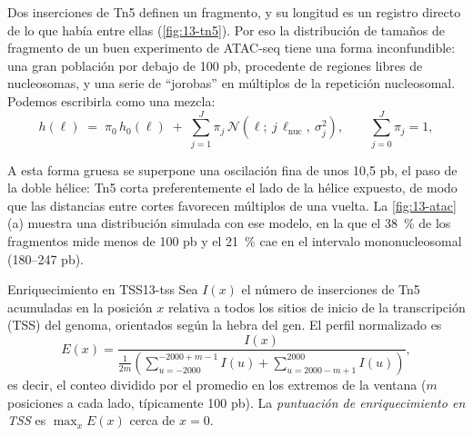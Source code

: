 Dos inserciones de Tn5 definen un fragmento, y su longitud es un registro directo de lo que había entre ellas (\cref{fig:13-tn5}). Por eso la distribución de tamaños de fragmento de un buen experimento de ATAC-seq tiene una forma inconfundible: una gran población por debajo de 100 pb, procedente de regiones libres de nucleosomas, y una serie de ``jorobas'' en múltiplos de la repetición nucleosomal. Podemos escribirla como una mezcla:
\begin{equation}\label{eq:13-atac}
h(\ell) \;=\; \pi_0\,h_0(\ell) \;+\; \sum_{j=1}^{J}\pi_j\,\mathcal N\!\left(\ell;\ j\,\ell_{\text{nuc}},\ \sigma_j^2\right),
\qquad \sum_{j=0}^{J}\pi_j = 1 ,
\end{equation}
\begin{simbolos}
\end{simbolos}
\noindent A esta forma gruesa se superpone una oscilación fina de unos 10,5 pb, el paso de la doble hélice: Tn5 corta preferentemente el lado de la hélice expuesto, de modo que las distancias entre cortes favorecen múltiplos de una vuelta. La \cref{fig:13-atac}\,(a) muestra una distribución simulada con ese modelo, en la que el \SI{38}{\percent} de los fragmentos mide menos de 100 pb y el \SI{21}{\percent} cae en el intervalo mononucleosomal (180--247 pb).

\begin{definicion}{Enriquecimiento en TSS}{13-tss}
Sea $I(x)$ el número de inserciones de Tn5 acumuladas en la posición $x$ relativa a todos los sitios de inicio de la transcripción (TSS) del genoma, orientados según la hebra del gen. El perfil normalizado es
\begin{equation}\label{eq:13-tss}
E(x) = \frac{I(x)}{\tfrac{1}{2m}\left(\sum_{u=-2000}^{-2000+m-1} I(u) + \sum_{u=2000-m+1}^{2000} I(u)\right)},
\end{equation}
es decir, el conteo dividido por el promedio en los extremos de la ventana ($m$ posiciones a cada lado, típicamente 100 pb). La \emph{puntuación de enriquecimiento en TSS} es $\max_x E(x)$ cerca de $x=0$.
\end{definicion}

\begin{simbolos}
\end{simbolos}

